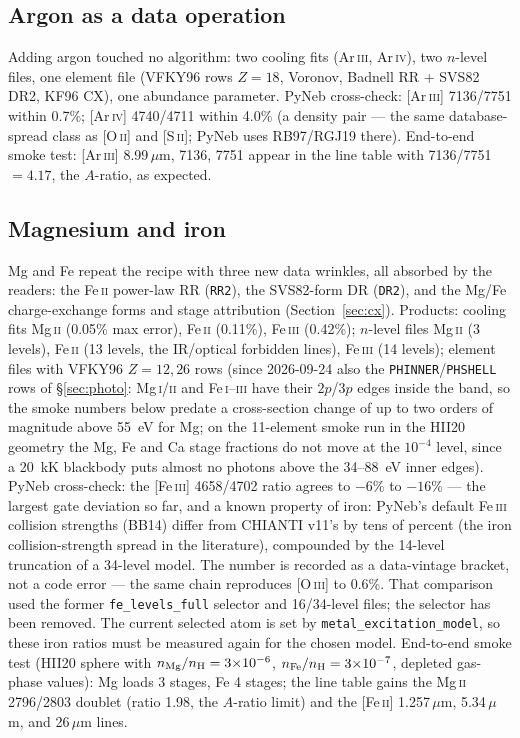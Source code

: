 \documentclass[english,a4paper]{my_memo}
\newcommand{\code}[1]{\texttt{#1}}
\begin{document}
\subsection{Argon as a data operation}
Adding argon touched no algorithm: two cooling fits (Ar\,\textsc{iii},
Ar\,\textsc{iv}), two $n$-level files, one element file (VFKY96 rows
$Z{=}18$, Voronov, Badnell RR + SVS82 DR2, KF96 CX), one abundance
parameter.  PyNeb cross-check: [Ar\,\textsc{iii}] 7136/7751 within
0.7\%; [Ar\,\textsc{iv}] 4740/4711 within 4.0\% (a density pair --- the
same database-spread class as [O\,\textsc{ii}] and [S\,\textsc{ii}];
PyNeb uses RB97/RGJ19 there).  End-to-end smoke test: [Ar\,\textsc{iii}]
8.99\,$\mu$m, 7136, 7751 appear in the line table with
7136/7751 $= 4.17$, the $A$-ratio, as expected.

\subsection{Magnesium and iron}
Mg and Fe repeat the recipe with three new data wrinkles, all absorbed
by the readers: the Fe\,\textsc{ii} power-law RR (\code{RR2}), the
SVS82-form DR (\code{DR2}), and the Mg/Fe charge-exchange forms and
stage attribution (Section~\ref{sec:cx}).  Products: cooling fits
Mg\,\textsc{ii} (0.05\% max error), Fe\,\textsc{ii} (0.11\%),
Fe\,\textsc{iii} (0.42\%); $n$-level files Mg\,\textsc{ii} (3 levels),
Fe\,\textsc{ii} (13 levels, the IR/optical forbidden lines),
Fe\,\textsc{iii} (14 levels); element files with VFKY96 $Z{=}12, 26$
rows (since 2026-09-24 also the \code{PHINNER}/\code{PHSHELL} rows of
\S\ref{sec:photo}: Mg\,\textsc{i}/\textsc{ii} and
Fe\,\textsc{i}--\textsc{iii} have their $2p$/$3p$ edges inside the band,
so the smoke numbers below predate a cross-section change of up to two
orders of magnitude above 55~eV for Mg; on the 11-element smoke run in the HII20 geometry the Mg, Fe and Ca stage
fractions do not move at the $10^{-4}$ level, since a 20~kK blackbody puts
almost no photons above the 34--88~eV inner edges).  PyNeb cross-check: the [Fe\,\textsc{iii}] 4658/4702 ratio agrees
to $-6$\% to $-16$\% --- the largest gate deviation so far, and a known
property of iron: PyNeb's default Fe\,\textsc{iii} collision strengths
(BB14) differ from CHIANTI v11's by tens of percent
(the iron collision-strength spread in the literature), compounded by
the 14-level truncation of a 34-level model.  The number is recorded as
a data-vintage bracket, not a code error --- the same chain reproduces
[O\,\textsc{iii}] to 0.6\%.  That comparison used the former \code{fe\_levels\_full} selector and
16/34-level files; the selector has been removed.  The current selected
atom is set by \code{metal\_excitation\_model}, so these iron ratios must
be measured again for the chosen model.  End-to-end smoke test (HII20 sphere with
$n_{\rm Mg}/n_{\rm H} = 3{\times}10^{-6}$,
$n_{\rm Fe}/n_{\rm H} = 3{\times}10^{-7}$, depleted gas-phase values):
Mg loads 3 stages, Fe 4 stages; the line table gains the Mg\,\textsc{ii}
2796/2803 doublet (ratio 1.98, the $A$-ratio limit) and the
[Fe\,\textsc{ii}] 1.257\,$\mu$m, 5.34\,$\mu$m, and 26\,$\mu$m lines.
\end{document}
